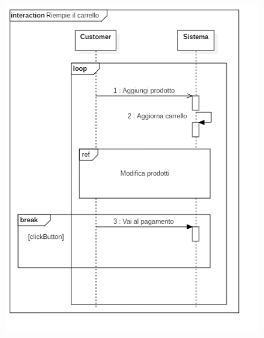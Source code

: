 \documentclass[12pt]{article}
\begin{document}
\begin{figure}[h!]
	\begin{center}
 	 	\includegraphics[keepaspectratio]{media/diagrams/sequence/riempi_carrello.png}
	\end{center}
\end{figure}
\end{document}
